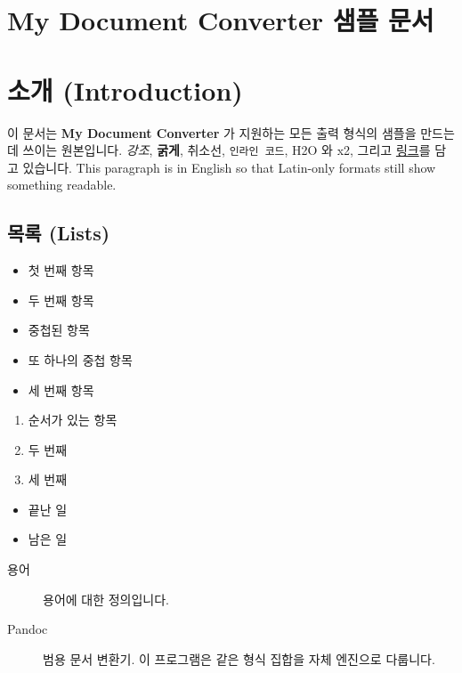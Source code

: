 \documentclass[11pt]{article}
\date{}
\begin{document}
\section*{My Document Converter 샘플 문서}\label{my-document-converter-샘플-문서}

\section*{소개 (Introduction)}\label{소개-introduction}

이 문서는 \textbf{My Document Converter} 가 지원하는 모든 출력 형식의 샘플을 만드는 데 쓰이는
원본입니다.
\emph{강조}, \textbf{굵게}, 취소선, \verb|인라인 코드|, H2O 와 x2, 그리고
\href{https://example.com}{링크}를 담고
있습니다.
This paragraph is in English so that Latin-only formats still show
something readable.

\subsection*{목록 (Lists)}\label{목록-lists}

\begin{itemize}
\item 첫 번째 항목
\item 두 번째 항목
\item 중첩된 항목
\item 또 하나의 중첩 항목
\item 세 번째 항목
\end{itemize}

\begin{enumerate}
\item 순서가 있는 항목
\item 두 번째
\item 세 번째
\end{enumerate}

\begin{itemize}
\item 끝난 일
\item 남은 일
\end{itemize}

\begin{description}
\item[용어] 용어에 대한 정의입니다.
\end{description}

\begin{description}
\item[Pandoc] 범용 문서 변환기. 이 프로그램은 같은 형식 집합을 자체 엔진으로 다룹니다.
\end{description}
\end{document}
